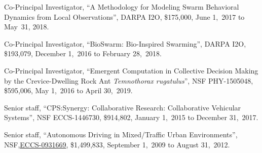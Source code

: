\documentclass[10pt]{article}           %
\newcommand{\blankline}{\quad\pagebreak[3]}
\begin{document}
\begin{bibenum}
    \item Co-Principal Investigator, ``A Methodology for Modeling Swarm
        Behavioral Dynamics from Local Observations'', DARPA I2O,
        \$175,000, June 1,~2017 to May~31, 2018.

    \item Co-Principal Investigator, ``BioSwarm: Bio-Inspired
        Swarming'', DARPA I2O, \$193,079, December 1,~2016 to
        February 28,~2018.

    \item Co-Principal Investigator, ``Emergent Computation in
        Collective Decision Making by the Crevice-Dwelling Rock Ant
        \emph{Temnothorax rugatulus}'', NSF PHY-1505048, \$595,006, May
        1,~2016 to April 30,~2019.

    \item Senior staff,
        ``CPS:Synergy: Collaborative Research: Collaborative Vehicular
        Systems'', NSF ECCS-1446730, \$914,802, January 1,~2015 to
        December 31,~2017.

    \item Senior staff,
        ``Autonomous Driving in Mixed\-/Traffic Urban Environments'',
        NSF,\linebreak[4]
        \href{http://www.nsf.gov/awardsearch/showAward.do?AwardNumber=0931669}{ECCS-0931669},
        \$1,499,833, September 1,~2009 to August 31,~2012.

\end{bibenum}

%
%
%
%
%
%
%
%
\end{document}
